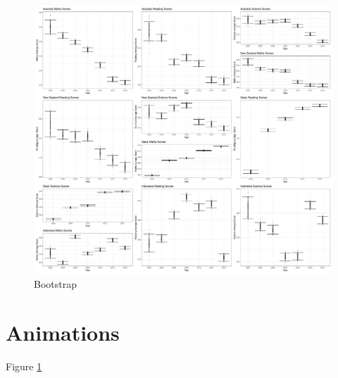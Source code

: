 \begin{Schunk}
\begin{figure}[H]
\includegraphics[width=1\linewidth]{learningtower_files/figure-latex/bs-plot-1} \caption[Bootstrap]{Bootstrap}\label{fig:bs-plot}
\end{figure}
\end{Schunk}

\hypertarget{animations}{%
\section{Animations}\label{animations}}

Figure \ref{fig:bs-plot}



\address{%
Priya Ravindra Dingorkar\\
Monash University\\%
Department Econometrics and Business Statistics\\ Clayton, Australia\\
%
\url{https://www.linkedin.com/in/priya-dingorkar/}\\%
%
\href{mailto:priyadingorkar@gmail.com}{\nolinkurl{priyadingorkar@gmail.com}}%
}

\address{%
Kevin Y.X. Wang\\
University of Sydney\\%
Data scientist\\ Illumina, Inc.\\ School of Mathematics and
Statistics\\ Sydney, Australia\\
%
\url{https://kevinwang09.github.io/}\\%
%
\href{mailto:kevinwangstats@gmail.com}{\nolinkurl{kevinwangstats@gmail.com}}%
}

\address{%
Dianne Cook\\
Monash University\\%
Department Econometrics and Business Statistics\\ Clayton, Australia\\
%
\url{http://dicook.org/}\\%
%
\href{mailto:dicook@monash.edu}{\nolinkurl{dicook@monash.edu}}%
}
